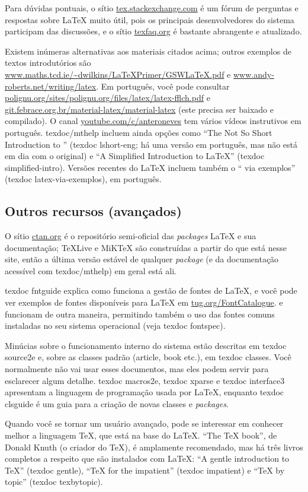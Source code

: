 Para dúvidas pontuais, o sítio \url{tex.stackexchange.com} é um
fórum de perguntas e respostas sobre \LaTeX{} muito útil, pois os
principais desenvolvedores do sistema participam das discussões, e o
sítio \url{texfaq.org} é bastante abrangente e atualizado.

\froufrou

Existem inúmeras alternativas aos materiais citados acima; outros exemplos de
textos introdutórios são \url{www.maths.tcd.ie/~dwilkins/LaTeXPrimer/GSWLaTeX.pdf}
e \url{www.andy-roberts.net/writing/latex}. Em português, você pode
consultar \url{polignu.org/sites/polignu.org/files/latex/latex-fflch.pdf}
e \url{git.febrace.org.br/material-latex/material-latex} (este precisa ser
baixado e compilado). O canal \url{youtube.com/c/anteroneves} tem vários
vídeos instrutivos em português. \textsf{texdoc/mthelp} incluem ainda
opções como ``The Not So Short Introduction to \LaTeXe{}'' (\textsf{texdoc
lshort-eng}; há uma versão em português, mas não está em dia com o
original) e ``A Simplified Introduction to \LaTeX{}'' (\textsf{texdoc
simplified-intro}). Versões recentes do \LaTeX{} incluem também o
``\LaTeXe{} via exemplos'' (\textsf{texdoc latex-via-exemplos}), em português.

\subsection{Outros recursos (avançados)}

O sítio \url{ctan.org} é o repositório semi-oficial das \textit{packages}
\LaTeX{} e sua documentação; \TeX{}Live e MiK\TeX{} são construídas a
partir do que está nesse site, então a última versão estável de qualquer
\textit{package} (e da documentação acessível com \textsf{texdoc/mthelp})
em geral está ali.

\textsf{texdoc fntguide} explica como funciona a gestão de fontes de
\LaTeX{}, e você pode ver exemplos de fontes disponíveis para \LaTeX{}
em \url{tug.org/FontCatalogue}. \LuaLaTeX{} e \XeLaTeX{} funcionam de
outra maneira, permitindo também o uso das fontes comuns instaladas
no seu sistema operacional (veja \textsf{texdoc fontspec}).

Minúcias sobre o funcionamento interno do sistema estão descritas em
\textsf{texdoc source2e} e, sobre as classes padrão (\textsf{article, book}
etc.), em \textsf{texdoc classes}. Você normalmente não vai usar esses
documentos, mas eles podem servir para esclarecer algum detalhe.
\textsf{texdoc macros2e}, \textsf{texdoc xparse} e \textsf{texdoc
interface3} apresentam a linguagem de programação usada por \LaTeX{},
enquanto \textsf{texdoc clsguide} é um guia para a criação de novas
classes e \textit{packages}.

Quando você se tornar um usuário avançado, pode se interessar em conhecer
melhor a linguagem \TeX{}, que está na base do \LaTeX{}. ``The \TeX{} book'',
de Donald Knuth (o criador do \TeX), é amplamente recomendado, mas há três
livros completos a respeito que são instalados com \LaTeX{}: ``A gentle
introduction to \TeX{}'' (\textsf{texdoc gentle}), ``\TeX{} for the
impatient'' (\textsf{texdoc impatient}) e ``\TeX{} by topic'' (\textsf{texdoc
texbytopic}).
